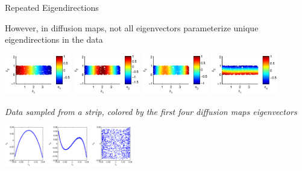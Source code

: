 \documentclass[12pt]{beamer}
\begin{document}
\begin{frame}{Repeated Eigendirections}

However, in diffusion maps, not all eigenvectors parameterize unique eigendirections in the data


\includegraphics[height=0.7in]{strip_discrete1}
\includegraphics[height=0.7in]{strip_discrete2}
\includegraphics[height=0.7in]{strip_discrete3}
\includegraphics[height=0.7in]{strip_discrete4}

\vspace{-0.1in}
{\em \scriptsize Data sampled from a strip, colored by the first four diffusion maps eigenvectors}

\vspace{0.1in}

\hspace{1.15in}
\includegraphics[height=0.7in]{strip_corr_12}
\hspace{0.3in}
\includegraphics[height=0.7in]{strip_corr_13}
\hspace{0.3in}
\includegraphics[height=0.7in]{strip_corr_14}


\end{frame}
\end{document}

